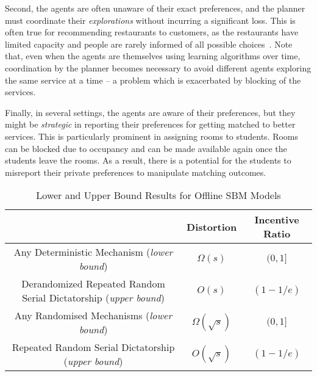 \documentclass[letterpaper,11pt]{article}
\newcommand{\kibitz}[2]{\ifnum\Comments=1{\color{#1}{#2}}\fi}
\newcommand{\dm}[1]{\kibitz{ForestGreen}{[Deb: #1]}}
\begin{document}
Second, the agents are often unaware of their exact preferences, and the planner must coordinate their \emph{explorations} without incurring a significant loss. This is often true for recommending restaurants to customers, as the restaurants have limited capacity and people are rarely informed of all possible choices~\cite{Wald08}. Note that, even when the agents are themselves using learning algorithms over time, coordination by the planner becomes necessary to avoid different agents exploring the same service at a time -- a problem which is exacerbated by blocking of the services.

Finally, in several settings, the agents are aware of their preferences, but they might be \emph{strategic} in reporting their preferences for getting matched to better services. This is particularly prominent in assigning rooms to students. Rooms can be blocked due to occupancy and can be made available again once the students leave the rooms. As a result, there is a potential for the students to misreport their private preferences to manipulate matching outcomes.%

\begin{table*}[!t]
\label{tab:1}
\setlength{\tabcolsep}{3pt}
\center
\caption{Lower and Upper Bound Results for Offline SBM Models\label{table:results_OSBM}}
\begin{tabular}{c|cc} \hline
 & Distortion & Incentive Ratio  \\ \hline
Any Deterministic Mechanism (\emph{lower bound}) & $\Omega(s)$ & $(0,1]$  \\  
Derandomized Repeated Random Serial Dictatorship (\emph{upper bound}) & $O(s)$ & $(1-1/e)$ \\ \hline
Any Randomised Mechanisms (\emph{lower bound}) & $\Omega(\sqrt{s})$ & $(0,1]$  \\  
Repeated Random Serial Dictatorship  (\emph{upper bound}) & $O(\sqrt{s})$ & $(1 - 1/e)$  \\ \hline
\end{tabular}
\end{table*}%
\end{document}
